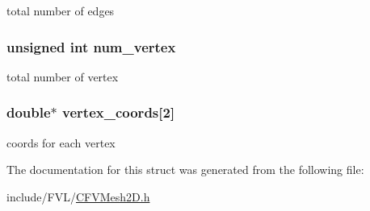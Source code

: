 total number of edges 

\hypertarget{structFVL_1_1CFVMesh2D_1_1CFVMesh2D__cuda_a66b841fd6e58a9fc9b63df4fe982178f}{
\subsubsection[{num\_\-vertex}]{\setlength{\rightskip}{0pt plus 5cm}unsigned int {\bf num\_\-vertex}}}
\label{d6/d30/structFVL_1_1CFVMesh2D_1_1CFVMesh2D__cuda_a66b841fd6e58a9fc9b63df4fe982178f}


total number of vertex 

\hypertarget{structFVL_1_1CFVMesh2D_1_1CFVMesh2D__cuda_a03658bd1b0082d5bd0726d7ef81c0bc2}{
\subsubsection[{vertex\_\-coords}]{\setlength{\rightskip}{0pt plus 5cm}double$\ast$ {\bf vertex\_\-coords}\mbox{[}2\mbox{]}}}
\label{d6/d30/structFVL_1_1CFVMesh2D_1_1CFVMesh2D__cuda_a03658bd1b0082d5bd0726d7ef81c0bc2}


coords for each vertex 



The documentation for this struct was generated from the following file:\begin{DoxyCompactItemize}
\item 
include/FVL/\hyperlink{CFVMesh2D_8h}{CFVMesh2D.h}\end{DoxyCompactItemize}

